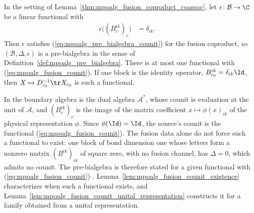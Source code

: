 \begin{lemma}%
    \label{lem:mpoalg_fusion_coproduct_counit}
    \leanok
    In the setting of Lemma~\ref{thm:mpoalg_fusion_coproduct_coassoc}, let
    $\epsilon\colon\mathcal B\to\C$ be a linear functional with
    \begin{align}
        \epsilon\big((B_c^{ik})_c\big)
         & =\delta_{ik}.
        \label{eq:mpoalg_fusion_counit}
    \end{align}
    Then $\epsilon$ satisfies (\ref{eq:mpoalg_pre_bialgebra_counit}) for
    the fusion coproduct, so $(\mathcal B,\Delta,\epsilon)$ is a
    pre-bialgebra in the sense of Definition~\ref{def:mpoalg_pre_bialgebra}.
    There is at most one functional with (\ref{eq:mpoalg_fusion_counit}). If
    one block is the identity operator, $B_{c_0}^{ik}=\delta_{ik}\Id$, then
    $X\mapsto D_{c_0}^{-1}\tr X_{c_0}$ is such a functional.

    In \cite[Section~4]{Molnar2022MPOAlgebrasI} the boundary algebra is the
    dual algebra $\mathcal A^*$, whose counit is evaluation at the unit of
    $\mathcal A$, and $(B_c^{ik})_c$ is the image of the matrix coefficient
    $x\mapsto\phi(x)_{ik}$ of the physical representation $\phi$. Since
    $\phi(\Id)=\Id$, the source's counit is the functional
    (\ref{eq:mpoalg_fusion_counit}). The fusion data alone do not force such
    a functional to exist: one block of bond dimension one whose letters form
    a nonzero matrix $(B^{ik})_{ik}$ of square zero, with no fusion channel,
    has $\Delta=0$, which admits no counit. The pre-bialgebra is therefore stated
    for a given functional with (\ref{eq:mpoalg_fusion_counit})
    \cite{gap:mrgscp22_pre_bialgebra_counit_scope}.
    Lemma~\ref{lem:mpoalg_fusion_counit_existence} characterizes when such a
    functional exists, and
    Lemma~\ref{lem:mpoalg_fusion_counit_unital_representation} constructs it
    for a family obtained from a unital representation.
\end{lemma}

